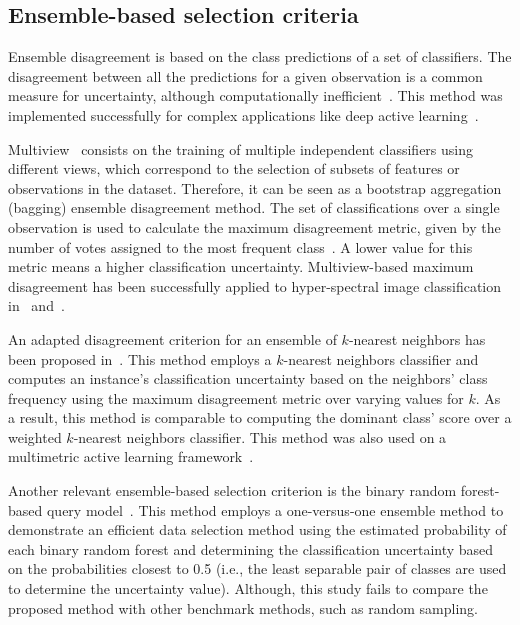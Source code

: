 \documentclass[parskip=full]{scrartcl}
\begin{document}
\subsection{Ensemble-based selection criteria}

Ensemble disagreement is based on the class predictions of a set of classifiers. The disagreement
between all the predictions for a given observation is a common measure for uncertainty, although
computationally inefficient~\cite{Ruzicka2020,Pasolli2016}. This method was implemented successfully
for complex applications like deep active learning~\cite{Ruzicka2020}.

Multiview~\cite{Muslea2006} consists on the training of multiple independent classifiers using
different views, which correspond to the selection of subsets of features or observations in the
dataset. Therefore, it can be seen as a bootstrap aggregation (bagging) ensemble disagreement
method. The set of classifications over a single observation is used to calculate the maximum
disagreement metric, given by the number of votes assigned to the most frequent
class~\cite{Shrivastava2021}. A lower value for this metric means a higher classification
uncertainty. Multiview-based maximum disagreement has been successfully applied to hyper-spectral
image classification in~\cite{Di2012} and~\cite{Zhou2014}.

An adapted disagreement criterion for an ensemble of $k$-nearest neighbors has been proposed
in~\cite{Pasolli2016}. This method employs a $k$-nearest neighbors classifier and computes an
instance's classification uncertainty based on the neighbors' class frequency using the maximum
disagreement metric over varying values for $k$. As a result, this method is comparable to computing
the dominant class' score over a weighted $k$-nearest neighbors classifier. This method was also
used on a multimetric active learning framework~\cite{Zhang2016}.

Another relevant ensemble-based selection criterion is the binary random forest-based query
model~\cite{Su2020}. This method employs a one-versus-one ensemble method to demonstrate an
efficient data selection method using the estimated probability of each binary random forest and
determining the classification uncertainty based on the probabilities closest to 0.5 (i.e., the
least separable pair of classes are used to determine the uncertainty value). Although, this study
fails to compare the proposed method with other benchmark methods, such as random sampling.
\end{document}
